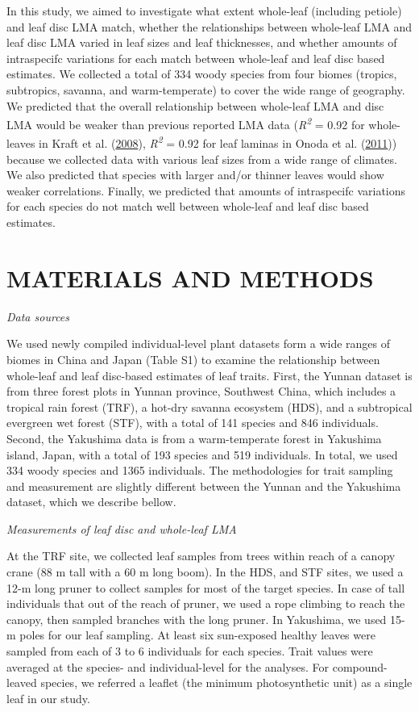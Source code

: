 \documentclass[
  12pt,
  a4paper,
,tablecaptionabove
]{scrartcl}
\begin{document}
In this study, we aimed to investigate what extent whole-leaf (including
petiole) and leaf disc LMA match, whether the relationships between
whole-leaf LMA and leaf disc LMA varied in leaf sizes and leaf
thicknesses, and whether amounts of intraspecifc variations for each
match between whole-leaf and leaf disc based estimates. We collected a
total of 334 woody species from four biomes (tropics, subtropics,
savanna, and warm-temperate) to cover the wide range of geography. We
predicted that the overall relationship between whole-leaf LMA and disc
LMA would be weaker than previous reported LMA data
(\emph{R\textsuperscript{2}} = 0.92 for whole-leaves in Kraft et al.
(\protect\hyperlink{ref-Kraft2008}{2008}), \emph{R\textsuperscript{2}} =
0.92 for leaf laminas in Onoda et al.
(\protect\hyperlink{ref-Onoda2011}{2011})) because we collected data
with various leaf sizes from a wide range of climates. We also predicted
that species with larger and/or thinner leaves would show weaker
correlations. Finally, we predicted that amounts of intraspecifc
variations for each species do not match well between whole-leaf and
leaf disc based estimates.

\hypertarget{materials-and-methods}{%
\section{MATERIALS AND METHODS}\label{materials-and-methods}}

\emph{Data sources}

We used newly compiled individual-level plant datasets form a wide
ranges of biomes in China and Japan (Table S1) to examine the
relationship between whole-leaf and leaf disc-based estimates of leaf
traits. First, the Yunnan dataset is from three forest plots in Yunnan
province, Southwest China, which includes a tropical rain forest (TRF),
a hot-dry savanna ecosystem (HDS), and a subtropical evergreen wet
forest (STF), with a total of 141 species and 846 individuals. Second,
the Yakushima data is from a warm-temperate forest in Yakushima island,
Japan, with a total of 193 species and 519 individuals. In total, we
used 334 woody species and 1365 individuals. The methodologies for trait
sampling and measurement are slightly different between the Yunnan and
the Yakushima dataset, which we describe bellow.

\emph{Measurements of leaf disc and whole-leaf LMA}

At the TRF site, we collected leaf samples from trees within reach of a
canopy crane (88 m tall with a 60 m long boom). In the HDS, and STF
sites, we used a 12-m long pruner to collect samples for most of the
target species. In case of tall individuals that out of the reach of
pruner, we used a rope climbing to reach the canopy, then sampled
branches with the long pruner. In Yakushima, we used 15-m poles for our
leaf sampling. At least six sun-exposed healthy leaves were sampled from
each of 3 to 6 individuals for each species. Trait values were averaged
at the species- and individual-level for the analyses. For
compound-leaved species, we referred a leaflet (the minimum
photosynthetic unit) as a single leaf in our study.
\end{document}
